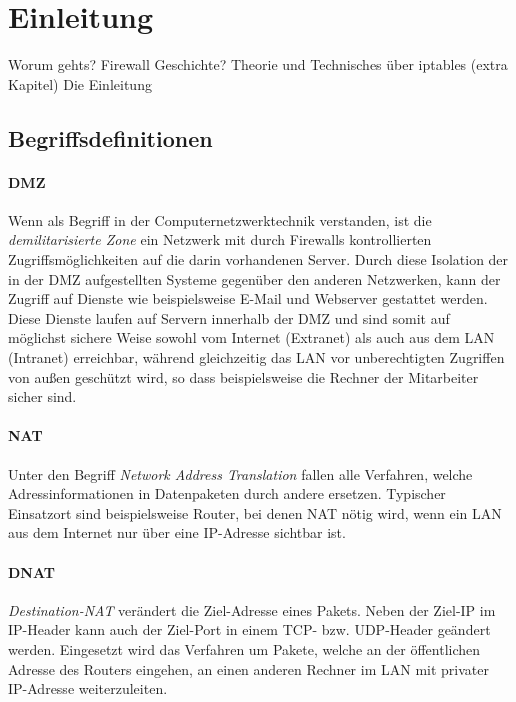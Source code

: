 \section{Einleitung}

Worum gehts? Firewall Geschichte? Theorie und Technisches über iptables (extra Kapitel)
Die Einleitung \cite{iptables}


\subsection{Begriffsdefinitionen}\label{sec.begriffe}

\paragraph{DMZ}
Wenn als Begriff in der Computernetzwerktechnik verstanden, ist die
\emph{demilitarisierte Zone} ein Netzwerk mit durch Firewalls
kontrollierten Zugriffs\-mög\-lich\-keiten auf die darin vorhandenen Server.
Durch diese Isolation der in der DMZ aufgestellten Systeme gegenüber den anderen
Netzwerken, kann der Zugriff auf Dienste wie beispielsweise E-Mail und Webserver
gestattet werden.
Diese Dienste laufen auf Servern innerhalb der DMZ und sind somit auf möglichst
sichere Weise sowohl vom Internet (Extranet) als auch aus dem LAN (Intranet)
erreichbar,
während gleichzeitig das LAN vor unberechtigten Zugriffen von außen geschützt
wird, so dass beispielsweise die Rechner der Mitarbeiter sicher sind.

\paragraph{NAT}
Unter den Begriff \emph{Network Address Translation} fallen alle Verfahren,
welche Adressinformationen in Datenpaketen durch andere ersetzen.
Typischer Einsatzort sind beispielsweise Router, bei denen NAT nötig wird,
wenn ein LAN aus dem Internet nur über eine IP-Adresse sichtbar ist.

\paragraph{DNAT}
\emph{Destination-NAT} verändert die Ziel-Adresse eines Pakets.
Neben der Ziel-IP im IP-Header kann auch der Ziel-Port in einem
TCP- bzw. UDP-Header geändert werden.
Eingesetzt wird das Verfahren um Pakete, welche an der öf\-fent\-lichen Adresse
des Routers eingehen, an einen anderen Rechner im LAN mit privater IP-Adresse
weiterzuleiten.

